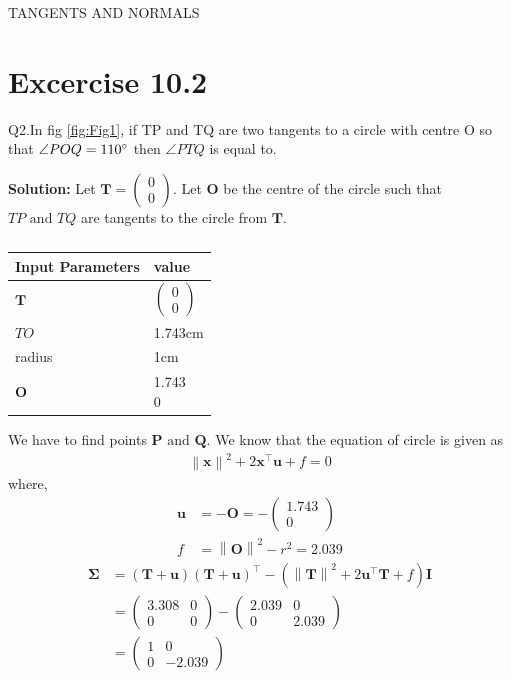 \documentclass[12pt]{article}
\providecommand{\brak}[1]{\ensuremath{\left(#1\right)}}
\providecommand{\norm}[1]{\left\lVert#1\right\rVert}
\newcommand{\solution}{\noindent \textbf{Solution: }}
\newcommand{\myvec}[1]{\ensuremath{\begin{pmatrix}#1\end{pmatrix}}}
\let\vec\mathbf
\begin{document}
\begin{center}
\textbf\large{TANGENTS AND NORMALS}

\end{center}
\section*{Excercise 10.2}
Q2.In fig \ref{fig:Fig1}, if TP and TQ are two tangents to a circle with centre O so that $\angle{POQ} = 110\degree$ then $\angle{PTQ}$ is equal to.

\solution
Let $\vec{T} = \myvec{0\\0}$. Let $\vec{O}$ be the centre of the circle such that $TP \text{ and } TQ$ are tangents to the circle from $\vec{T}$.
\begin{table}[h!]
\begin{center}
\begin{tabular}{|m{4cm}|m{2cm}|}
	\hline
	\textbf{Input Parameters} & \textbf{value}\\ 
	\hline
	$\vec{T}$ & $\myvec{0\\0}$\\
	\hline
	$TO$ & 1.743cm\\
	\hline
	radius & 1cm\\
	\hline
	$\vec{O}$ & \myvec{1.743\\0}\\
	\hline
\end{tabular}
\caption{}
\label{table:Table1}
\end{center}
\end{table}
We have to find points $\vec{P} \text{ and } \vec{Q}$. We know that the equation of circle is given as
\begin{align}
	\norm{\vec{x}}^2+2\vec{x}^\top \vec{u}+f=0
\end{align}
where,
\begin{align}
	\vec{u} &= -\vec{O} = -\myvec{1.743\\0}\\
	f &= \norm{\vec{O}}^2 - r^2 = 2.039
\end{align}
\begin{align}
	\vec{\Sigma} &= \brak{\vec{T}+\vec{u}}\brak{\vec{T}+\vec{u}}^\top - \brak{\norm{\vec{T}}^2 + 2\vec{u}^\top \vec{T}+f}\vec{I}\\
	&=\myvec{3.308&0 \\ 0&0} - \myvec{2.039&0 \\ 0&2.039}\\
	\label{eq:eq1}
	&=\myvec{1&0\\0&-2.039}
\end{align}
\end{document}
